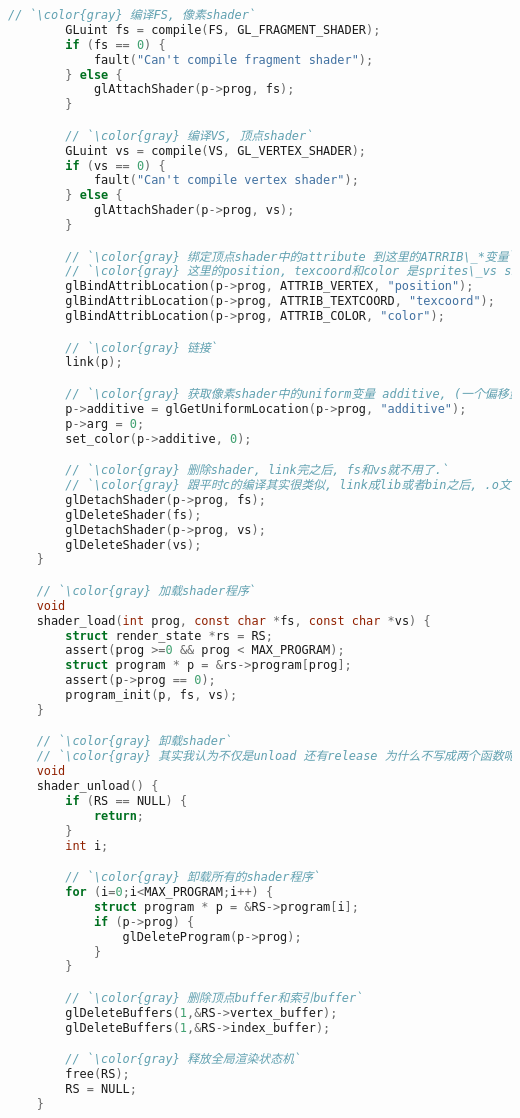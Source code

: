 {\begin{lstlisting}[language=C]
        // `\color{gray} 编译FS, 像素shader`
        GLuint fs = compile(FS, GL_FRAGMENT_SHADER);
        if (fs == 0) {
            fault("Can't compile fragment shader");
        } else {
            glAttachShader(p->prog, fs);
        }

        // `\color{gray} 编译VS, 顶点shader`
        GLuint vs = compile(VS, GL_VERTEX_SHADER);
        if (vs == 0) {
            fault("Can't compile vertex shader");
        } else {
            glAttachShader(p->prog, vs);
        }

        // `\color{gray} 绑定顶点shader中的attribute 到这里的ATRRIB\_*变量`
        // `\color{gray} 这里的position, texcoord和color 是sprites\_vs shader中的attribute`
        glBindAttribLocation(p->prog, ATTRIB_VERTEX, "position");
        glBindAttribLocation(p->prog, ATTRIB_TEXTCOORD, "texcoord");
        glBindAttribLocation(p->prog, ATTRIB_COLOR, "color");

        // `\color{gray} 链接`
        link(p);

        // `\color{gray} 获取像素shader中的uniform变量 additive, (一个偏移量, 默认是0)`
        p->additive = glGetUniformLocation(p->prog, "additive");
        p->arg = 0;
        set_color(p->additive, 0);

        // `\color{gray} 删除shader, link完之后, fs和vs就不用了.`
        // `\color{gray} 跟平时c的编译其实很类似, link成lib或者bin之后, .o文件就不用了.`
        glDetachShader(p->prog, fs);
        glDeleteShader(fs);
        glDetachShader(p->prog, vs);
        glDeleteShader(vs);
    }

    // `\color{gray} 加载shader程序`
    void
    shader_load(int prog, const char *fs, const char *vs) {
        struct render_state *rs = RS;
        assert(prog >=0 && prog < MAX_PROGRAM);
        struct program * p = &rs->program[prog];
        assert(p->prog == 0);
        program_init(p, fs, vs);
    }

    // `\color{gray} 卸载shader`
    // `\color{gray} 其实我认为不仅是unload 还有release 为什么不写成两个函数呢? `
    void
    shader_unload() {
        if (RS == NULL) {
            return;
        }
        int i;

        // `\color{gray} 卸载所有的shader程序`
        for (i=0;i<MAX_PROGRAM;i++) {
            struct program * p = &RS->program[i];
            if (p->prog) {
                glDeleteProgram(p->prog);
            }
        }

        // `\color{gray} 删除顶点buffer和索引buffer`
        glDeleteBuffers(1,&RS->vertex_buffer);
        glDeleteBuffers(1,&RS->index_buffer);

        // `\color{gray} 释放全局渲染状态机`
        free(RS);
        RS = NULL;
    }

    \end{lstlisting}
}

